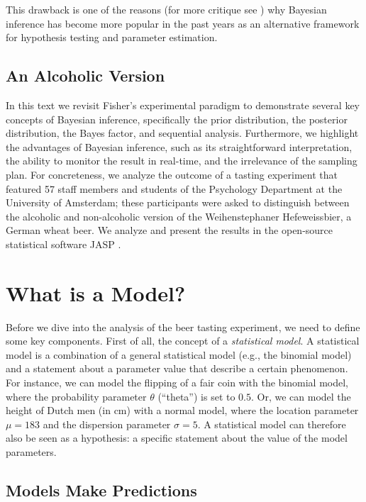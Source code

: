\documentclass[
]{book}
\begin{document}
This drawback is one of the reasons (for more critique see \citep{Wasserstein2016, BenjaminEtAl2018}) why Bayesian inference has become more popular in the past years as an alternative framework for hypothesis testing and parameter estimation.

\hypertarget{an-alcoholic-version}{%
\section{An Alcoholic Version}\label{an-alcoholic-version}}

In this text we revisit Fisher's experimental paradigm to demonstrate several key concepts of Bayesian inference, specifically the prior distribution, the posterior distribution, the Bayes factor, and sequential analysis. Furthermore, we highlight the advantages of Bayesian inference, such as its straightforward interpretation, the ability to monitor the result in real-time, and the irrelevance of the sampling plan. For concreteness, we analyze the outcome of a tasting experiment that featured 57 staff members and students of the Psychology Department at the University of Amsterdam; these participants were asked to distinguish between the alcoholic and non-alcoholic version of the Weihenstephaner Hefeweissbier, a German wheat beer. We analyze and present the results in the open-source statistical software JASP \citep{JASP2022}.

\hypertarget{what-is-a-model}{%
\chapter{What is a Model?}\label{what-is-a-model}}

Before we dive into the analysis of the beer tasting experiment, we need to define some key components. First of all, the concept of a \emph{statistical model}. A statistical model is a combination of a general statistical model (e.g., the binomial model) and a statement about a parameter value that describe a certain phenomenon. For instance, we can model the flipping of a fair coin with the binomial model, where the probability parameter \(\theta\) (``theta'') is set to \(0.5\). Or, we can model the height of Dutch men (in cm) with a normal model, where the location parameter \(\mu = 183\) and the dispersion parameter \(\sigma = 5\). A statistical model can therefore also be seen as a hypothesis: a specific statement about the value of the model parameters.

\hypertarget{models-make-predictions}{%
\section{Models Make Predictions}\label{models-make-predictions}}
\end{document}
